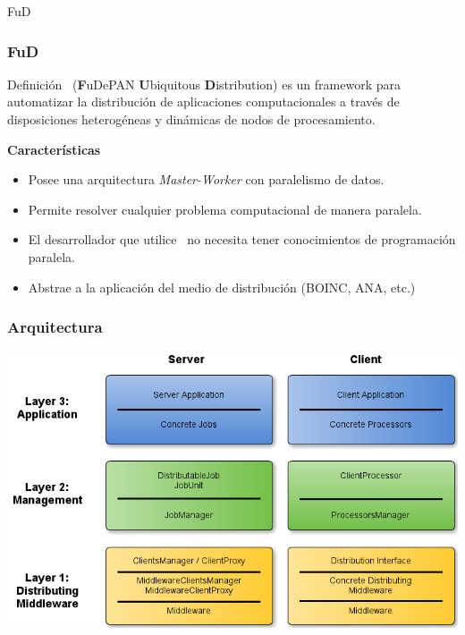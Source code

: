 \begin{subsection}{FuD}

	\begin{frame}\frametitle{FuD}
	    \begin{block}{Definición}
	        \fud\ (\textbf{F}uDePAN \textbf{U}biquitous \textbf{D}istribution) es un framework para automatizar la distribución de
	        aplicaciones computacionales a través de disposiciones heterogéneas y dinámicas de nodos de procesamiento.
	    \end{block}
	
	    \pause
	    \vspace{2mm}
	    \textbf{Características}
	    \vspace{1mm}
	    \begin{itemize}
	        \item Posee una arquitectura \textit{Master-Worker} con paralelismo de datos.
	        \item Permite resolver cualquier problema computacional de manera paralela.
	        \item El desarrollador que utilice \fud \ no necesita tener conocimientos de programación paralela.
	        \item Abstrae a la aplicación del medio de distribución (BOINC, ANA, etc.)
	    \end{itemize}
	\end{frame}

	\begin{frame}\frametitle{Arquitectura}
	     \begin{center}
	        \includegraphics[scale=.4]{images/AbstractLayers-FuD.png}
	      \end{center}
	\end{frame}


\end{subsection}
